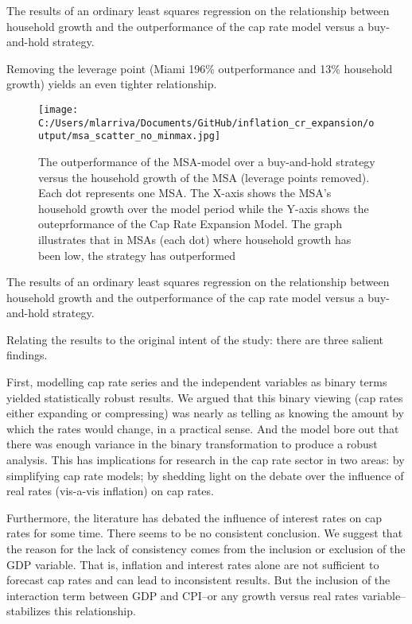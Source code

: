 \documentclass[jrfm,article,submit,oneauthor,pdftex]{Definitions/mdpi}
\begin{document}
\begin{table}[H]
\caption{The results of an ordinary least squares regression on the relationship between household growth and the outperformance of the cap rate model versus a buy-and-hold strategy.\label{tab1}}
\end{table}

Removing the leverage point (Miami 196\% outperformance and 13\% household growth) yields an even tighter relationship.

\begin{figure}[H]
\texttt{[image: C:/Users/mlarriva/Documents/GitHub/inflation\_cr\_expansion/output/msa\_scatter\_no\_minmax.jpg]}
\caption{The outperformance of the MSA-model over a buy-and-hold strategy versus the household growth of the MSA (leverage points removed). Each dot represents one MSA. The X-axis shows the MSA's household growth over the model period while the Y-axis shows the outeprformance of the Cap Rate Expansion Model. The graph illustrates that in MSAs (each dot) where household growth has been low, the strategy has outperformed \label{fig1}}
\end{figure}

\begin{table}[H]
\caption{The results of an ordinary least squares regression on the relationship between household growth and the outperformance of the cap rate model versus a buy-and-hold strategy. \label{tab1}}
\end{table}

Relating the results to the original intent of the study: there are three salient findings.

First, modelling cap rate series and the independent variables as binary terms yielded statistically robust results. We argued that this binary viewing (cap rates either expanding or compressing) was nearly as telling as knowing the amount by which the rates would change, in a practical sense. And the model bore out that there was enough variance in the binary transformation to produce a robust analysis. This has implications for research in the cap rate sector in two areas: by simplifying cap rate models; by shedding light on the debate over the influence of real rates (vis-a-vis inflation) on cap rates.

Furthermore, the literature has debated the influence of interest rates on cap rates for some time. There seems to be no consistent conclusion. We suggest that the reason for the lack of consistency comes from the inclusion or exclusion of the GDP variable. That is, inflation and interest rates alone are not sufficient to forecast cap rates and can lead to inconsistent results. But the inclusion of the interaction term between GDP and CPI--or any growth versus real rates variable-- stabilizes this relationship.
\end{document}
